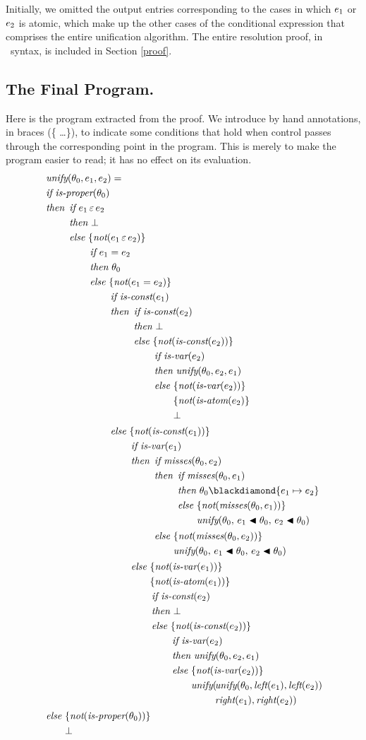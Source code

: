 \documentclass[runningheads]{llncs}
\DeclareMathOperator{\unot}{\emph{not}\kern-.0pt}
\DeclareMathOperator{\unify}{\emph{unify}}
\DeclareMathOperator{\isatm}{\emph{is-atom}}
\DeclareMathOperator{\iscnst}{\emph{is-const}}
\DeclareMathOperator{\isvar}{\emph{is-var}}
\DeclareMathOperator{\lef}{\emph{left}}
\DeclareMathOperator{\rig}{\emph{right}}
\begin{document}
 
 Initially, we omitted the output entries corresponding to the cases in which $e_{1}$ or $e_{2}$ is atomic, which make up the other cases of the conditional expression that comprises the entire unification algorithm.  The entire resolution proof, in \SNARK\ syntax, is included in  Section \ref{proof}.
 \nobreak
\subsection{The Final Program.}
\label{program}  


\vspace{-\baselineskip}
\vspace{10pt}

Here is the program extracted from the proof.  We introduce by hand annotations, in braces (\{ \ldots \}), to indicate some conditions that hold when control passes through the corresponding point in the program. This is merely to make the program easier to read; it has no effect on its evaluation.
\pagebreak
\vspace{-1cm}
\[
\begin{aligned}
&\unify(\thet{0}, \e{1}, \e{2}) = \\
&{\ucond 
  {\isprop(\thet{0})}
  {\ucond 
  {\e{1} \occursin \e{2}}
  {\fail}
  {\ucond 
    {\e{1} = \e{2}} 
    {\thet{0}} 
    {\ucond 
      {\iscnst(\e{1})} 
      {\ucond 
       {\iscnst(\e{2})} 
       {\fail} 
       {\ucond 
  {\isvar(\e{2})} 
  {\unify(\thet{0}, \e{2}, \e{1})} 
  {\begin{aligned}[t]
        &\{\unot (\isatm(\e{2}) \} \\
        &{\fail}
        \end{aligned}
        } }  
      }
      {\ucond
      {\isvar(\e{1})}
      {\ucond
{\misses(\thet{0}, \e{2})}
{\ucond
  {\misses(\thet{0}, \e{1})}
  {\thet{0} \compose \repl{\e{1}} {\e{2}}}
  {\unify(\thet{0},\, \e{1}\apply \thet{0},\, \e{2}\apply\thet{0} )}
}
{\unify(\thet{0},\, \e{1}\apply\thet{0},\, \e{2}\apply\thet{0} )}
}
      {\begin{aligned}[t]
&{\{\unot (\isatm(\e{1}))\}} \\
&{\ucond
{\iscnst(\e{2})}
{\fail}
{\ucond
{\isvar(\e{2})}
{\unify(\thet{0}, \e{2}, \e{1})}
{\unify(\!\!\!\begin{aligned}[t]
&\unify(\thet{0},\lef(\e{1}),\lef(\e{2}) \\ 
&\rig(\e{1}),\rig(\e{2}))
\end{aligned})
}
}
}
\end{aligned}}
      }}}
    }
    {\fail} }
    \end{aligned}
\]
\end{document}
